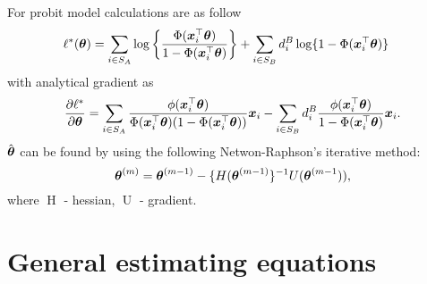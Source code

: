 \documentclass[
  letterpaper,
  DIV=11,
  numbers=noendperiod]{scrreprt}
\begin{document}
For probit model calculations are as follow \[
\begin{align*}
    \begin{split}
        \ell^{*}(\boldsymbol{\theta}) & = \sum_{i \in S_{A}}\log\left\{\frac{\Phi(\boldsymbol{x}_{i}^{\top}\boldsymbol{\theta})}{1 - \Phi(\boldsymbol{x}_{i}^{\top}\boldsymbol{\theta})}\right\} + \sum_{i \in S_{B}}d_{i}^{B}\log\{1 - \Phi(\boldsymbol{x}_{i}^{\top}\boldsymbol{\theta})\}
    \end{split}
\end{align*}
\] with analytical gradient as \[
        \frac{\partial \ell^*}{\partial\boldsymbol{\theta}} = \sum_{i \in S_A}\frac{\phi(\boldsymbol{x}_i^{\top}\boldsymbol{\theta})}{\Phi(\boldsymbol{x}_i^{\top}\boldsymbol{\theta})(1 - \Phi(\boldsymbol{x}_i^{\top}\boldsymbol{\theta}))}\boldsymbol{x}_i - \sum_{i \in S_B}d_i^B\frac{\phi(\boldsymbol{x}_i^{\top}\boldsymbol{\theta})}{1 - \Phi(\boldsymbol{x}_i^{\top}\boldsymbol{\theta})}\boldsymbol{x}_i.
\] \(\hat{\boldsymbol{\theta}}\) can be found by using the following
Netwon-Raphson's iterative method: \[
\boldsymbol{\theta}^{(m)} = \boldsymbol{\theta}^{(m-1)} - \{H(\boldsymbol{\theta}^{(m-1)}\}^{-1}U(\boldsymbol{\theta}^{(m-1})),
\] where \(\operatorname{H}\) - hessian, \(\operatorname{U}\) -
gradient.

\hypertarget{general-estimating-equations}{%
\section{General estimating
equations}\label{general-estimating-equations}}
\end{document}
